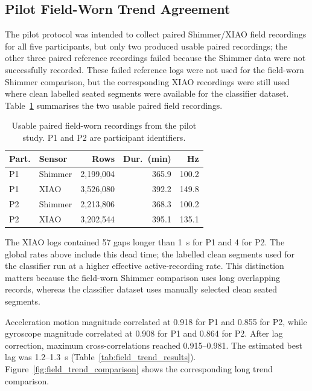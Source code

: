 \subsection{Pilot Field-Worn Trend Agreement}

The pilot protocol was intended to collect paired Shimmer/XIAO field recordings for all five participants, but only two produced usable paired recordings; the other three paired reference recordings failed because the Shimmer data were not successfully recorded. These failed reference logs were not used for the field-worn Shimmer comparison, but the corresponding XIAO recordings were still used where clean labelled seated segments were available for the classifier dataset. Table~\ref{tab:field_recording_summary} summarises the two usable paired field recordings.

\begin{table}[!htbp]
    \centering
    \scriptsize
    \caption{Usable paired field-worn recordings from the pilot study. P1 and P2 are participant identifiers.}
    \label{tab:field_recording_summary}
    \begin{tabular*}{\linewidth}{@{\extracolsep{\fill}}llrrr@{}}
        \toprule
        Part. & Sensor & Rows & Dur.\ (min) & Hz \\
        \midrule
        P1 & Shimmer & 2,199,004 & 365.9 & 100.2 \\
        P1 & XIAO    & 3,526,080 & 392.2 & 149.8 \\
        P2 & Shimmer & 2,213,806 & 368.3 & 100.2 \\
        P2 & XIAO    & 3,202,544 & 395.1 & 135.1 \\
        \bottomrule
    \end{tabular*}
\end{table}

The XIAO logs contained 57 gaps longer than 1~s for P1 and 4 for P2. The global rates above include this dead time; the labelled clean segments used for the classifier run at a higher effective active-recording rate. This distinction matters because the field-worn Shimmer comparison uses long overlapping records, whereas the classifier dataset uses manually selected clean seated segments.

Acceleration motion magnitude correlated at 0.918 for P1 and 0.855 for P2, while gyroscope magnitude correlated at 0.908 for P1 and 0.864 for P2. After lag correction, maximum cross-correlations reached 0.915--0.981. The estimated best lag was 1.2--1.3~s (Table~\ref{tab:field_trend_results}). Figure~\ref{fig:field_trend_comparison} shows the corresponding long trend comparison.

